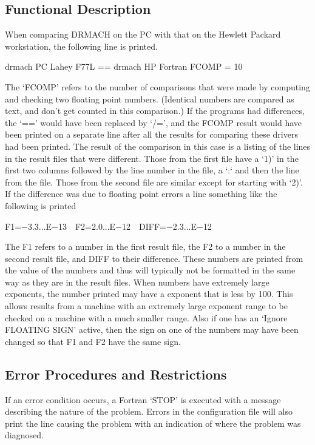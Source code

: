 \documentclass[twoside]{MATH77}
\begin{document}
\subsection{Functional Description}
When comparing DRMACH on the PC with that on the Hewlett Packard
workstation, the following line is printed.

drmach PC Lahey F77L  ==  drmach HP Fortran  FCOMP =  10

The `FCOMP' refers to the number of comparisons that were made by computing
and checking two floating point numbers.  (Identical numbers are compared as
text, and don't get counted in this comparison.)  If the programs had
differences, the `==' would have been replaced by `/=', and the FCOMP result
would have been printed on a separate line after all the results for comparing
these drivers had been printed.  The result of the comparison in this case is
a listing of the lines in the result files that were different.  Those from
the first file have a `1)' in the first two columns followed by the line
number in the file, a `:` and then the line from the file.  Those from the
second file are similar except for starting with `2)'.  If the difference was
due to floating point errors a line something like the following is printed

F1=$-$3.3...E$-$13\ \ F2=2.0...E$-$12\ \ DIFF=$-$2.3...E$-$12

The F1 refers to a number in the first result file, the F2 to a number in
the second result file, and DIFF to their difference.  These numbers are
printed from the value of the numbers and thus will typically not be
formatted in the same way as they are in the result files.  When numbers
have extremely large exponents, the number printed may have a exponent
that is less by 100.  This allows results from a machine with an extremely
large exponent range to be checked on a machine with a much smaller range.
Also if one has an `Ignore FLOATING SIGN' active, then the sign on one of
the numbers may have been changed so that F1 and F2 have the same sign.

\subsection{Error Procedures and Restrictions}
If an error condition occurs, a Fortran `STOP' is executed with a message
describing the nature of the problem.  Errors in the configuration file
will also print the line causing the problem with an indication of where
the problem was diagnosed.
\end{document}
